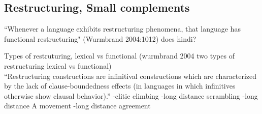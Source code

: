 \documentclass{article}
\begin{document}
\subsection{Restructuring, Small complements}
``Whenever a language exhibits restructuring
phenomena, that language has functional restructuring" (Wurmbrand 2004:1012) does hindi?

Types of restruturing, lexical vs functional (wurmbrand 2004 two types of restructuring lexical vs functional)\\
``Restructuring constructions are infinitival constructions which are characterized by the lack of clause-boundedness effects (in languages in which infinitives otherwise show clausal behavior).''
-clitic climbing
-long distance scrambling
-long distance A movement
-long distance agreement
\begin{example}
\end{example}
\end{document}
